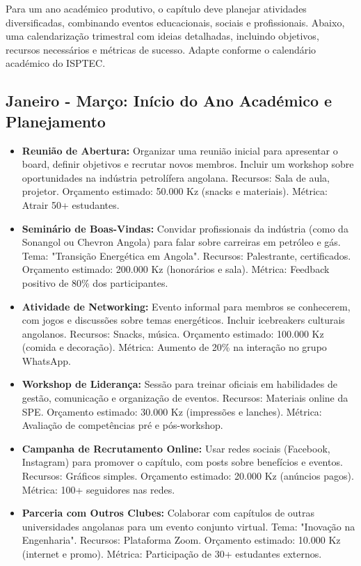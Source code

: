 \documentclass[12pt]{article}
\begin{document}
Para um ano académico produtivo, o capítulo deve planejar atividades diversificadas, combinando eventos educacionais, sociais e profissionais. Abaixo, uma calendarização trimestral com ideias detalhadas, incluindo objetivos, recursos necessários e métricas de sucesso. Adapte conforme o calendário académico do ISPTEC.

\subsection{Janeiro - Março: Início do Ano Académico e Planejamento}
\begin{itemize}
    \item \textbf{Reunião de Abertura:} Organizar uma reunião inicial para apresentar o board, definir objetivos e recrutar novos membros. Incluir um workshop sobre oportunidades na indústria petrolífera angolana. Recursos: Sala de aula, projetor. Orçamento estimado: 50.000 Kz (snacks e materiais). Métrica: Atrair 50+ estudantes.
    \item \textbf{Seminário de Boas-Vindas:} Convidar profissionais da indústria (como da Sonangol ou Chevron Angola) para falar sobre carreiras em petróleo e gás. Tema: "Transição Energética em Angola". Recursos: Palestrante, certificados. Orçamento estimado: 200.000 Kz (honorários e sala). Métrica: Feedback positivo de 80\% dos participantes.
    \item \textbf{Atividade de Networking:} Evento informal para membros se conhecerem, com jogos e discussões sobre temas energéticos. Incluir icebreakers culturais angolanos. Recursos: Snacks, música. Orçamento estimado: 100.000 Kz (comida e decoração). Métrica: Aumento de 20\% na interação no grupo WhatsApp.
    \item \textbf{Workshop de Liderança:} Sessão para treinar oficiais em habilidades de gestão, comunicação e organização de eventos. Recursos: Materiais online da SPE. Orçamento estimado: 30.000 Kz (impressões e lanches). Métrica: Avaliação de competências pré e pós-workshop.
    \item \textbf{Campanha de Recrutamento Online:} Usar redes sociais (Facebook, Instagram) para promover o capítulo, com posts sobre benefícios e eventos. Recursos: Gráficos simples. Orçamento estimado: 20.000 Kz (anúncios pagos). Métrica: 100+ seguidores nas redes.
    \item \textbf{Parceria com Outros Clubes:} Colaborar com capítulos de outras universidades angolanas para um evento conjunto virtual. Tema: "Inovação na Engenharia". Recursos: Plataforma Zoom. Orçamento estimado: 10.000 Kz (internet e promo). Métrica: Participação de 30+ estudantes externos.
\end{itemize}
\end{document}
